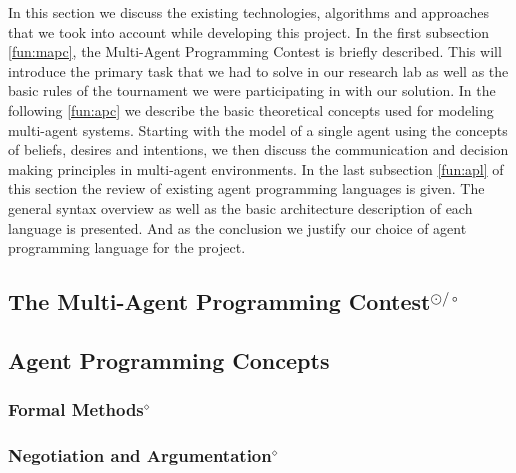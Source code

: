 In this section we discuss the existing technologies, algorithms and approaches that we took into account while developing this project. 
In the first subsection \autoref{fun:mapc}, the Multi-Agent Programming Contest is briefly described. 
This will introduce the primary task that we had to solve in our research lab as well as the basic rules of the tournament we were participating in with our solution.
In the following \autoref{fun:apc} we describe the basic theoretical concepts used for modeling multi-agent systems.
Starting with the model of a single agent using the concepts of beliefs, desires and intentions, we then discuss the communication and decision making principles in multi-agent environments.
In the last subsection \autoref{fun:apl} of this section the review of existing agent programming languages is given.
The general syntax overview as well as the basic architecture description of each language is presented. 
And as the conclusion we justify our choice of agent programming language for the project.

\subsection[The Multi-Agent Programming Contest]{The Multi-Agent Programming Contest$^{\odot/\circ}$}\label{fun:mapc}


\subsection{Agent Programming Concepts}\label{fun:apc}



\subsubsection[Formal Methods]{Formal Methods$^\diamond$}\label{fun:formal_methods}


\subsubsection[Negotiation and Argumentation]{Negotiation and Argumentation$^\diamond$}\label{fun:negotiation}


